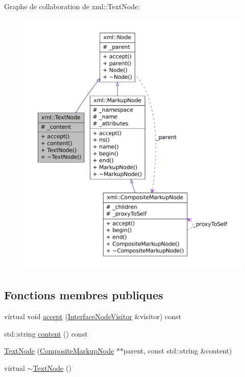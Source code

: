 Graphe de collaboration de xml::TextNode:\nopagebreak
\begin{figure}[H]
\begin{center}
\leavevmode
\includegraphics[width=400pt]{classxml_1_1_text_node__coll__graph}
\end{center}
\end{figure}
\subsection*{Fonctions membres publiques}
\begin{DoxyCompactItemize}
\item 
virtual void \hyperlink{classxml_1_1_text_node_ac918f8f74e141690e18cd8e23d174996}{accept} (\hyperlink{classxml_1_1_interface_node_visitor}{InterfaceNodeVisitor} \&visitor) const 
\item 
std::string \hyperlink{classxml_1_1_text_node_a25941b48615a65258cc17d85bc0691d1}{content} () const 
\item 
\hyperlink{classxml_1_1_text_node_aa792bfa28288ba0b52f38215acb1feb0}{TextNode} (\hyperlink{classxml_1_1_composite_markup_node}{CompositeMarkupNode} $\ast$$\ast$parent, const std::string \&content)
\item 
virtual \hyperlink{classxml_1_1_text_node_a631efcd9de6889ba2b8f31e578267d29}{$\sim$TextNode} ()
\end{DoxyCompactItemize}
